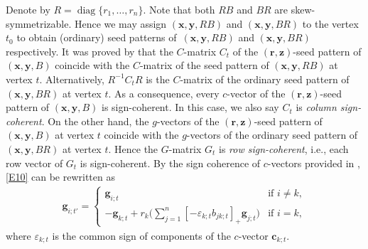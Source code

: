 \documentclass[10pt,a4paper]{amsart}
\numberwithin{equation}{section}
\begin{document}
Denote by $R=\operatorname{diag}\{r_1,\dots,r_n\}$. Note that both $RB$ and $BR$ are skew-symmetrizable. Hence we may assign $(\mathbf{x},\mathbf{y}, RB)$ and $(\mathbf{x},\mathbf{y},BR)$ to the vertex $t_0$ to obtain (ordinary) seed patterns of~$(\mathbf{x},\mathbf{y}, RB)$ and $(\mathbf{x},\mathbf{y},BR)$ respectively.
It was proved by \cite[Proposition 3.9]{Nakanishi14} that the $C$-matrix $C_t$ of the $(\mathbf{r},\mathbf{z})$-seed pattern of $(\mathbf{x},\mathbf{y}, B)$ coincide with the $C$-matrix of the seed pattern of $(\mathbf{x},\mathbf{y}, RB)$ at vertex $t$. Alternatively, $R^{-1}C_tR$ is the $C$-matrix of the ordinary seed pattern of $(\mathbf{x},\mathbf{y}, BR)$ at vertex $t$. As a consequence, every $c$-vector of the $(\mathbf{r},\mathbf{z})$-seed pattern of $(\mathbf{x},\mathbf{y}, B)$ is sign-coherent. In this case, we also say $C_t$ is {\it column sign-coherent}. On the other hand, the $g$-vectors of the $(\mathbf{r},\mathbf{z})$-seed pattern of $(\mathbf{x},\mathbf{y}, B)$ at vertex $t$ coincide with the $g$-vectors of the ordinary seed pattern of $(\mathbf{x},\mathbf{y},BR)$ at vertex $t$. Hence the $G$-matrix $G_t$ is {\it row sign-coherent}, i.e., each row vector of $G_t$ is sign-coherent.
By the sign coherence of $c$-vectors provided in \cite[Corollary 5.5]{GHKK2018}, \eqref{E10} can be rewritten as
\begin{align}\label{E15}
\mathbf{g}_{i;t'}=\begin{cases}\mathbf{g}_{i;t}& \text{if $i\neq k$},\\
 \displaystyle-\mathbf{g}_{k;t}+r_k\biggl(\sum\limits_{j=1}^{n}[-\varepsilon_{k;t} b_{jk;t}]_+\mathbf{g}_{j;t}\biggr)& \text{if $i=k$},
 \end{cases}
\end{align}
where $\varepsilon_{k;t}$ is the common sign of components of the $c$-vector $\mathbf{c}_{k;t}$.
\end{document}
